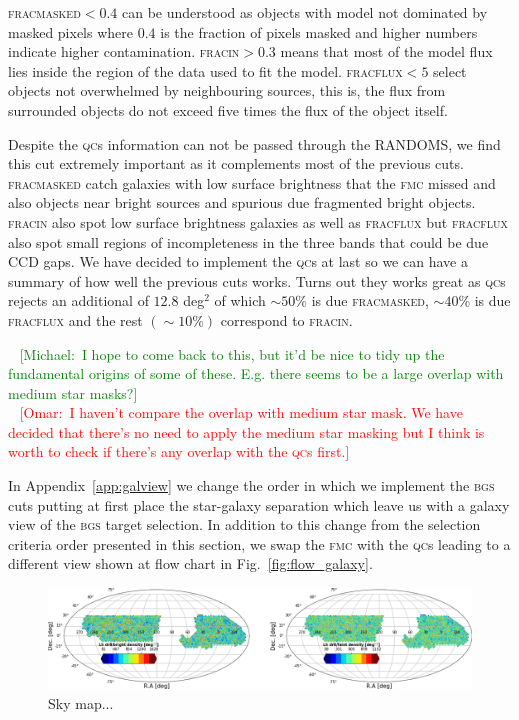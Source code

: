\documentclass[fleqn,usenatbib]{mnras}
\newcommand{\mike}[1]{~\newline\noindent \textcolor{Green}{{ [Michael:~{#1}]\\}}}
\newcommand{\omar}[1]{~\newline\noindent \textcolor{red}{{ [Omar:~{#1}]\\}}}
\newcommand{\BGS}{\textsc{bgs}\xspace}
\newcommand{\FMC}{{\textsc{fmc}}\xspace}
\newcommand{\FRACMASKED}{{\textsc{fracmasked}}\xspace}
\newcommand{\FRACFLUX}{{\textsc{fracflux}}\xspace}
\newcommand{\FRACIN}{{\textsc{fracin}}\xspace}
\newcommand{\QCs}{\textsc{qc}s\xspace}
\begin{document}
\FRACMASKED $< 0.4$ can be understood as objects with model not dominated by masked pixels where $0.4$ is the fraction of pixels masked and higher numbers indicate higher contamination. \FRACIN $> 0.3$ means that most of the model flux lies inside the region of the data used to fit the model. \FRACFLUX $< 5$ select objects not overwhelmed by neighbouring sources, this is, the flux from surrounded objects do not exceed five times the flux of the object itself.

Despite the \QCs information can not be passed through the RANDOMS, we find this cut extremely important as it complements most of the previous cuts. \FRACMASKED catch galaxies with low surface brightness that the \FMC missed and also objects near bright sources and spurious due fragmented bright objects. \FRACIN also spot low surface brightness galaxies as well as \FRACFLUX but \FRACFLUX also spot small regions of incompleteness in the three bands that could be due CCD gaps. We have decided to implement the \QCs at last so we can have a summary of how well the previous cuts works. Turns out they works great as \QCs rejects an additional of $12.8$ deg$^{2}$ of which $\sim 50 \%$ is due \FRACMASKED, $\sim 40 \%$ is due \FRACFLUX and the rest $(\sim 10 \%)$ correspond to \FRACIN.

\mike{I hope to come back to this, but it'd be nice to tidy up the fundamental origins of some of these.  E.g. there seems to be a large overlap with medium star masks?}
\omar{I haven't compare the overlap with medium star mask. We have decided that there's no need to apply the medium star masking but I think is worth to check if there's any overlap with the \QCs first.}

In  Appendix~\ref{app:galview} we change the order in which we implement the \BGS cuts putting at first place the star-galaxy separation which leave us with a galaxy view of the \BGS target selection. In addition to this change from the selection criteria order presented in this section, we swap the \FMC with the \QCs leading to a different view shown at flow chart in Fig.~\ref{fig:flow_galaxy}. 


\begin{figure}
	\includegraphics[width=17cm]{images/skymaps_bright_faint.png}
    \caption{Sky map...}
    \label{fig:skymap_densities}
\end{figure}
\end{document}
